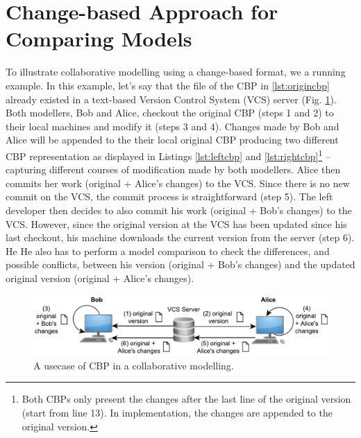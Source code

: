 \documentclass{jot}
\begin{document}
\section{Change-based Approach for Comparing Models}
\label{sec:change_based_approach_for_comparing_models}

To illustrate collaborative modelling using a change-based format, we a running example. In this example, let's say that the file of the CBP in \ref{lst:origincbp} already existed in a text-based Version Control System (VCS) server (Fig. \ref{fig:vcs}). Both modellers, Bob and Alice, checkout the original CBP (steps 1 and 2) to their local machines and modify it (steps 3 and 4). Changes made by Bob and Alice will be appended to the their local original CBP producing two different CBP representation as displayed in Listings \ref{lst:leftcbp} and \ref{lst:rightcbp}\footnote{Both CBPs only present the changes after the last line of the original version (start from line 13). In implementation, the changes are appended to the original version.} -- capturing different courses of modification made by both modellers. Alice then commits her work (original + Alice's changes) to the VCS. Since there is no new commit on the VCS, the commit process is straightforward (step 5). The left developer then decides to also commit his work (original + Bob's changes) to the VCS. However, since the original version at the VCS has been updated since his last checkout, 
his machine downloads the current version from the server (step 6). He
He also has to perform a model comparison to check the differences, and possible conflicts, between his version (original + Bob's changes) and the updated original version (original + Alice's changes). 

\begin{figure}[ht]
    \includegraphics[width=\linewidth]{VCS}
    \caption{A usecase of CBP in a collaborative modelling.}
    \label{fig:vcs}
\end{figure}
\end{document}
